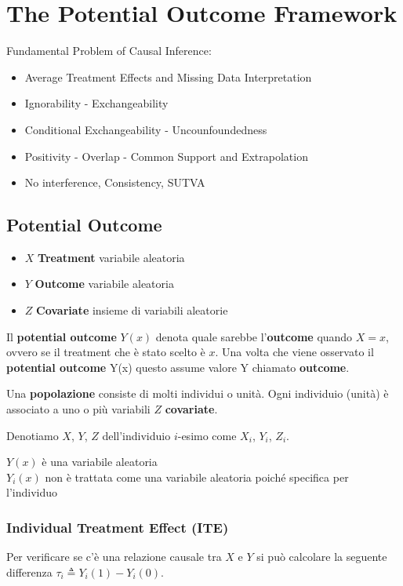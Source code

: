 \chapter{The Potential Outcome Framework}

Fundamental Problem of Causal Inference:
\begin{itemize}
  \item Average Treatment Effects and Missing Data Interpretation
  \item Ignorability - Exchangeability
  \item Conditional Exchangeability - Uncounfoundedness
  \item Positivity - Overlap - Common Support and Extrapolation
  \item No interference, Consistency, SUTVA
\end{itemize}

\section{Potential Outcome}

\begin{itemize}
  \item $X$ \textbf{Treatment} variabile aleatoria
  \item $Y$ \textbf{Outcome} variabile aleatoria
  \item $Z$ \textbf{Covariate} insieme di variabili aleatorie
\end{itemize}

Il \textbf{potential outcome} $Y(x)$ denota quale sarebbe l'\textbf{outcome} quando $X = x$, ovvero se il treatment che è stato scelto è $x$.
Una volta che viene osservato il \textbf{potential outcome} Y(x) questo assume valore Y chiamato \textbf{outcome}.

Una \textbf{popolazione} consiste di molti individui o unità.
Ogni individuio (unità) è associato a uno o più variabili $Z$ \textbf{covariate}.

Denotiamo $X$, $Y$, $Z$ dell'individuio $i$-esimo come $X_i$, $Y_i$, $Z_i$.

$Y(x)$ è una variabile aleatoria\\
$Y_i(x)$ non è trattata come una variabile aleatoria poiché specifica per l'individuo

\subsection*{Individual Treatment Effect (ITE)}
Per verificare se c'è una relazione causale tra $X$ e $Y$ si può calcolare la seguente differenza
$\tau_i \triangleq Y_i(1) - Y_i(0)$.

